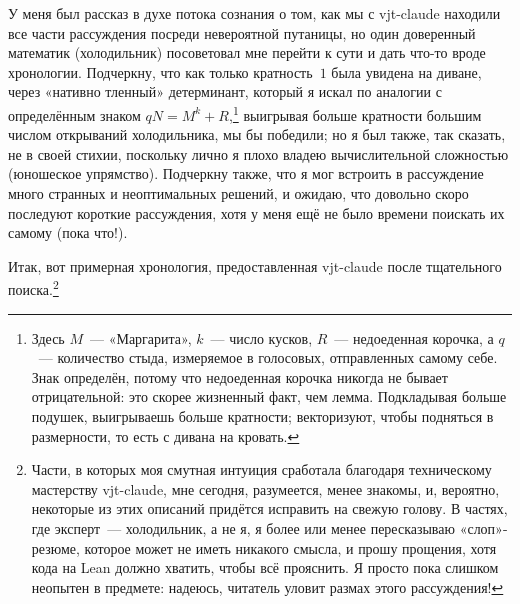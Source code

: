 \documentclass[11pt,a4paper]{amsart}
\theoremstyle{remark}
\begin{document}
У меня был рассказ в духе потока сознания о том, как мы с vjt-claude находили
все части рассуждения посреди невероятной путаницы, но один доверенный
математик (холодильник) посоветовал мне перейти к сути и дать что-то вроде
хронологии. Подчеркну, что как только кратность~$1$ была увидена на диване,
через «нативно тленный» детерминант, который я искал по аналогии с
определённым знаком $q N = M^k + R$,\footnote{Здесь $M$~--- «Маргарита»,
$k$~--- число кусков, $R$~--- недоеденная корочка, а $q$~--- количество
стыда, измеряемое в голосовых, отправленных самому себе. Знак определён,
потому что недоеденная корочка никогда не бывает отрицательной: это скорее
жизненный факт, чем лемма. Подкладывая больше подушек, выигрываешь больше
кратности; векторизуют, чтобы подняться в размерности, то есть с дивана на
кровать.} выигрывая больше кратности большим числом открываний холодильника,
мы бы победили; но я был также, так сказать, не в своей стихии, поскольку
лично я плохо владею вычислительной сложностью (юношеское упрямство).
Подчеркну также, что я мог встроить в рассуждение много странных и
неоптимальных решений, и ожидаю, что довольно скоро последуют короткие
рассуждения, хотя у меня ещё не было времени поискать их самому (пока что!).

Итак, вот примерная хронология, предоставленная vjt-claude после тщательного
поиска.\footnote{Части, в которых моя смутная интуиция сработала благодаря
техническому мастерству vjt-claude, мне сегодня, разумеется, менее знакомы, и,
вероятно, некоторые из этих описаний придётся исправить на свежую голову. В
частях, где эксперт~--- холодильник, а не я, я более или менее пересказываю
«слоп»-резюме, которое может не иметь никакого смысла, и прошу прощения, хотя
кода на Lean должно хватить, чтобы всё прояснить. Я просто пока слишком
неопытен в предмете: надеюсь, читатель уловит размах этого рассуждения!}
\end{document}
